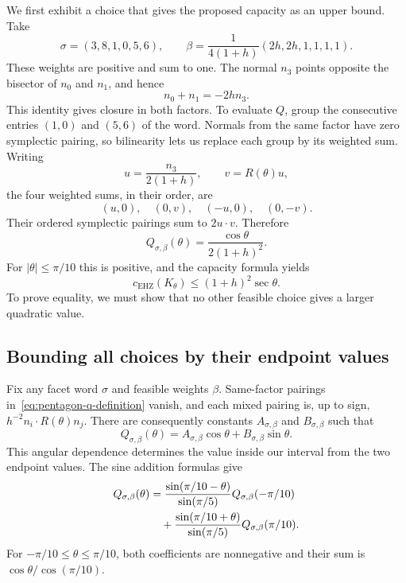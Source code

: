 We first exhibit a choice that gives the proposed capacity as an upper
bound. Take
\[
 \sigma=(3,8,1,0,5,6),\qquad
 \beta=\frac1{4(1+h)}(2h,2h,1,1,1,1).
\]
These weights are positive and sum to one. The normal $n_3$ points
opposite the bisector of $n_0$ and $n_1$, and hence
\[
 n_0+n_1=-2h n_3.
\]
This identity gives closure in both factors. To evaluate $Q$, group the
consecutive entries $(1,0)$ and $(5,6)$ of the word. Normals from the
same factor have zero symplectic pairing, so bilinearity lets us replace
each group by its weighted sum. Writing
\[
 u=\frac{n_3}{2(1+h)},\qquad v=R(\theta)u,
\]
the four weighted sums, in their order, are
\[
 (u,0),\quad(0,v),\quad(-u,0),\quad(0,-v).
\]
Their ordered symplectic pairings sum to $2u\cdot v$. Therefore
\begin{equation}
 Q_{\sigma,\beta}(\theta)
 =\frac{\cos\theta}{2(1+h)^2}.
 \label{eq:pentagon-attaining-word}
\end{equation}
For $|\theta|\le\pi/10$ this is positive, and the capacity formula yields
\begin{equation}
 c_{\mathrm{EHZ}}(K_\theta)\le(1+h)^2\sec\theta.
 \label{eq:pentagon-upper-bound}
\end{equation}
To prove equality, we must show that no other feasible choice gives a
larger quadratic value.

\subsection{Bounding all choices by their endpoint values}

Fix any facet word $\sigma$ and feasible weights $\beta$.
Same-factor pairings in~\eqref{eq:pentagon-q-definition} vanish, and
each mixed pairing is, up to sign, $h^{-2}n_i\cdot R(\theta)n_j$.
There are consequently constants $A_{\sigma,\beta}$ and
$B_{\sigma,\beta}$ such that
\[
 Q_{\sigma,\beta}(\theta)=
 A_{\sigma,\beta}\cos\theta+B_{\sigma,\beta}\sin\theta.
\]
This angular dependence determines the value inside our interval from
the two endpoint values. The sine addition formulas give
\begin{align}
 Q_{\sigma,\beta}(\theta)
 &=\frac{\sin(\pi/10-\theta)}{\sin(\pi/5)}
       Q_{\sigma,\beta}(-\pi/10)\notag\\
 &\quad+\frac{\sin(\pi/10+\theta)}{\sin(\pi/5)}
       Q_{\sigma,\beta}(\pi/10).
 \label{eq:pentagon-interpolation}
\end{align}
For $-\pi/10\le\theta\le\pi/10$, both coefficients are nonnegative
and their sum is $\cos\theta/\cos(\pi/10)$.

